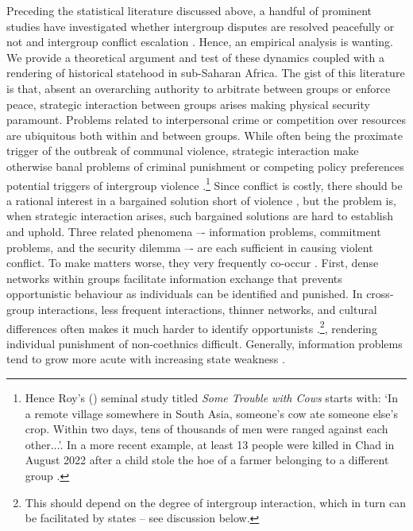 Preceding the statistical literature discussed above, a handful of 
prominent studies have investigated whether intergroup disputes are resolved
peacefully or not and intergroup conflict escalation
\citep{Fearon_1996,Lake_1996, Fearon1995}. Hence, an empirical analysis is
wanting. We provide a theoretical argument and test of these dynamics coupled
with a rendering of historical statehood in sub-Saharan Africa. The gist of this
literature is that, absent an overarching authority to arbitrate between groups
or enforce peace, strategic interaction between groups arises making physical
security paramount. Problems related to interpersonal crime or competition over
resources are ubiquitous both within and between groups. While often being the
proximate trigger of the outbreak of communal violence, strategic interaction
make otherwise banal problems of criminal punishment or competing policy
preferences potential triggers of intergroup violence \citep{diamond2013world,
	Eaton_2008, Fearon1995, Fearon_1996, Lake_1996}.\footnote{Hence Roy's
		(\citeyear[1]{roy1994some}) seminal study titled \textit{Some
		Trouble with Cows} starts with: `In a remote village somewhere
		in South Asia, someone's cow ate someone else's crop. Within two
		days, tens of thousands of men were ranged against each
		other...'. In a more recent example, at least 13 people were
	killed in Chad in August 2022 after a child stole the hoe of a farmer
belonging to a different group \citep{NRK2022}.} Since conflict is costly, there
should be a rational interest in a bargained solution short of violence
\citep{Fearon1995}, but the problem is, when strategic interaction arises, such
bargained solutions are hard to establish and uphold. Three related phenomena –-
information problems, commitment problems, and the security dilemma –- are each
sufficient in causing violent conflict. To make matters worse, they very
frequently co-occur \citep[46]{Lake_1996}. First, dense networks within groups
facilitate information exchange that prevents opportunistic behaviour as
individuals can be identified and punished. In cross-group interactions, less
frequent interactions, thinner networks, and cultural differences often makes it
much harder to identify opportunists \citep[719]{Fearon_1996}.\footnote{This
should depend on the degree of intergroup interaction, which in turn can be
facilitated by states – see discussion below.}, rendering individual punishment
of non-coethnics difficult. Generally, information problems tend to grow more
acute with increasing state weakness \citep[46]{Fearon1995, Lake_1996}.

